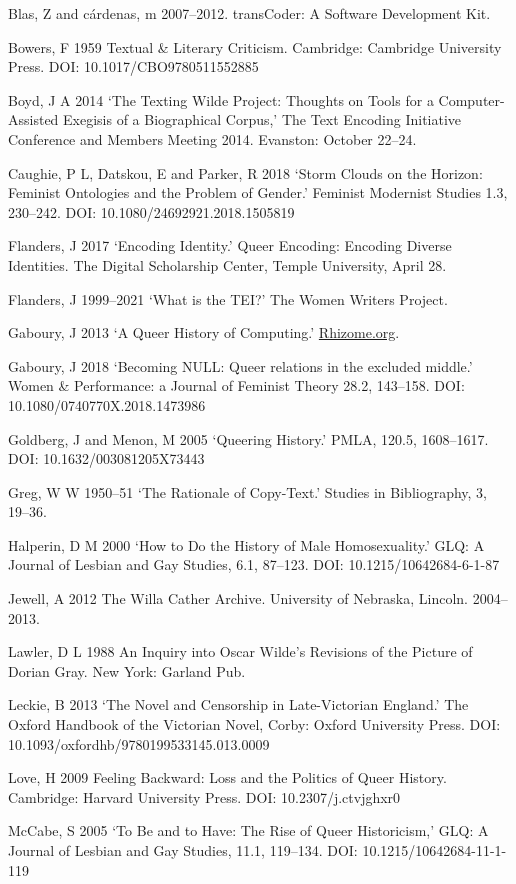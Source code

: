 \documentclass[11pt]{article}
\begin{document}
Blas, Z and cárdenas, m 2007--2012. transCoder: A Software
Development Kit.

Bowers, F 1959 Textual \& Literary Criticism. Cambridge:
Cambridge University Press. DOI: 10.1017/CBO9780511552885

Boyd, J A 2014 ‘The Texting Wilde Project: Thoughts on Tools
for a Computer-Assisted Exegisis of a Biographical Corpus,' The Text
Encoding Initiative Conference and Members Meeting 2014. Evanston:
October 22--24.

Caughie, P L, Datskou, E and Parker, R 2018 ‘Storm Clouds on
the Horizon: Feminist Ontologies and the Problem of Gender.' Feminist
Modernist Studies 1.3, 230--242. DOI: 10.1080/24692921.2018.1505819

Flanders, J 2017 ‘Encoding Identity.' Queer Encoding: Encoding
Diverse Identities. The Digital Scholarship Center, Temple University,
April 28.

Flanders, J 1999--2021 ‘What is the TEI?' The Women Writers
Project.

Gaboury, J 2013 ‘A Queer History of Computing.'
\url{Rhizome.org}.

Gaboury, J 2018 ‘Becoming NULL: Queer relations in the
excluded middle.' Women \& Performance: a Journal of Feminist Theory
28.2, 143--158. DOI: 10.1080/0740770X.2018.1473986

Goldberg, J and Menon, M 2005 ‘Queering History.' PMLA, 120.5,
1608--1617. DOI: 10.1632/003081205X73443

Greg, W W 1950--51 ‘The Rationale of Copy-Text.' Studies in
Bibliography, 3, 19--36.

Halperin, D M 2000 ‘How to Do the History of Male
Homosexuality.' GLQ: A Journal of Lesbian and Gay Studies, 6.1, 87--123.
DOI: 10.1215/10642684-6-1-87

Jewell, A 2012 The Willa Cather Archive. University of
Nebraska, Lincoln. 2004--2013.

Lawler, D L 1988 An Inquiry into Oscar Wilde's Revisions of
the Picture of Dorian Gray. New York: Garland Pub.

Leckie, B 2013 ‘The Novel and Censorship in Late-Victorian
England.' The Oxford Handbook of the Victorian Novel, Corby: Oxford
University Press. DOI: 10.1093/oxfordhb/9780199533145.013.0009

Love, H 2009 Feeling Backward: Loss and the Politics of Queer
History. Cambridge: Harvard University Press. DOI: 10.2307/j.ctvjghxr0

McCabe, S 2005 ‘To Be and to Have: The Rise of Queer
Historicism,' GLQ: A Journal of Lesbian and Gay Studies, 11.1, 119--134.
DOI: 10.1215/10642684-11-1-119
\end{document}
